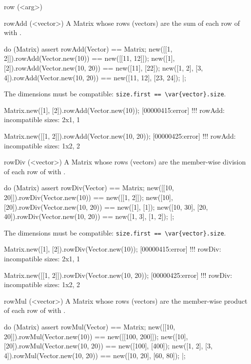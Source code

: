 \begin{urbiscriptapi}
\item[row](<arg>)%
\begin{urbiassert}

\end{urbiassert}

\item[rowAdd](<vector>)%
  A Matrix whose rows (vectors) are the sum of each row of \this with
  .
\begin{urbiscript}
do (Matrix)
{
  assert
  {
    rowAdd(Vector) == Matrix;
    new([[1, 2]]).rowAdd(Vector.new(10))     == new([[11, 12]]);
    new([1], [2]).rowAdd(Vector.new(10, 20)) == new([11], [22]);
    new([1, 2], [3, 4]).rowAdd(Vector.new(10, 20)) == new([11, 12], [23, 24]);
  }
}|;
\end{urbiscript}

  The dimensions must be compatible:
  \lstinline|size.first == \var{vector}.size|.
\begin{urbiscript}
Matrix.new([1], [2]).rowAdd(Vector.new(10));
[00000415:error] !!! rowAdd: incompatible sizes: 2x1, 1

Matrix.new([[1, 2]]).rowAdd(Vector.new(10, 20));
[00000425:error] !!! rowAdd: incompatible sizes: 1x2, 2
\end{urbiscript}

\item[rowDiv](<vector>)%
  A Matrix whose rows (vectors) are the member-wise division of each row of
  \this with .
\begin{urbiscript}
do (Matrix)
{
  assert
  {
    rowDiv(Vector) == Matrix;
    new([[10, 20]]).rowDiv(Vector.new(10))     == new([[1, 2]]);
    new([10], [20]).rowDiv(Vector.new(10, 20)) == new([1], [1]);
    new([10, 30], [20, 40]).rowDiv(Vector.new(10, 20)) == new([1, 3], [1, 2]);
  }
}|;
\end{urbiscript}

  The dimensions must be compatible:
  \lstinline|size.first == \var{vector}.size|.
\begin{urbiscript}
Matrix.new([1], [2]).rowDiv(Vector.new(10));
[00000415:error] !!! rowDiv: incompatible sizes: 2x1, 1

Matrix.new([[1, 2]]).rowDiv(Vector.new(10, 20));
[00000425:error] !!! rowDiv: incompatible sizes: 1x2, 2
\end{urbiscript}

\item[rowMul](<vector>)%
  A Matrix whose rows (vectors) are the member-wise product of each row of
  \this with .
\begin{urbiscript}
do (Matrix)
{
  assert
  {
    rowMul(Vector) == Matrix;
    new([[10, 20]]).rowMul(Vector.new(10))     == new([[100, 200]]);
    new([10], [20]).rowMul(Vector.new(10, 20)) == new([100], [400]);
    new([1, 2], [3, 4]).rowMul(Vector.new(10, 20)) == new([10, 20], [60, 80]);
  }
}|;
\end{urbiscript}


\end{urbiscriptapi}
